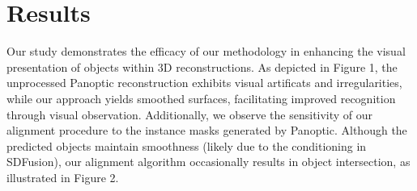 \section{Results}
\label{sec:results}
Our study demonstrates the efficacy of our methodology in enhancing the visual presentation of objects within 3D reconstructions. As depicted in Figure 1, the unprocessed Panoptic reconstruction exhibits visual artificats and irregularities, while our approach yields smoothed surfaces, facilitating improved recognition through visual observation. Additionally, we observe the sensitivity of our alignment procedure to the instance masks generated by Panoptic. Although the predicted objects maintain smoothness (likely due to the conditioning in SDFusion), our alignment algorithm occasionally results in object intersection, as illustrated in Figure 2.
